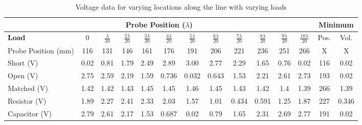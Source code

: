 \documentclass{article}
\begin{document}
\begin{table}[h]
	\begin{tabular}{|l|c|c|c|c|c|c|c|c|c|c|c|c|c|}
	\hline
	\multicolumn{12}{|c|}{\textbf{Probe Position ($\lambda$)}}                                                               	& \multicolumn{2}{c|}{\textbf{Minimum}} \\ \hline
	\textbf{Load}       & 0    & $\frac{\lambda}{20}$    & $\frac{2\lambda}{20}$    & $\frac{3\lambda}{20}$    & $\frac{4\lambda}{20}$     & $\frac{5\lambda}{20}$     & $\frac{6\lambda}{20}$     & $\frac{7\lambda}{20}$    & $\frac{8\lambda}{20}$    & $\frac{9\lambda}{20}$    & $\frac{10\lambda}{20}$   & Pos.         & Vol.          \\ \hline
	Probe Position (mm) & 116  & 131  & 146  & 161  & 176   & 191   & 206   & 221  & 236  & 251  & 266  & X            & X             \\ \hline
	Short (V)           & 0.02 & 0.81 & 1.79 & 2.49 & 2.89  & 3.00  & 2.77  & 2.29 & 1.65 & 0.76 & 0.02 & 116          & 0.02          \\ \hline
	Open (V)            & 2.75 & 2.59 & 2.19 & 1.59 & 0.736 & 0.032 & 0.643 & 1.53 & 2.21 & 2.61 & 2.73 & 193          & 0.02          \\ \hline
	Matched (V)         & 1.42 & 1.42 & 1.43 & 1.45 & 1.45  & 1.46  & 1.45  & 1.43 & 1.42 & 1.4  & 1.39 & 266          & 1.39          \\ \hline
	Resistor (V)        & 1.89 & 2.27 & 2.41 & 2.33 & 2.03  & 1.57  & 1.01  & 0.434& 0.591& 1.25 & 1.87 & 227          & 0.346         \\ \hline
	Capacitor (V)       & 2.79 & 2.61 & 2.17 & 1.53 & 0.687 & 0.02  & 0.79  & 1.65 & 2.31 & 2.69 & 2.77 & 191          & 0.02          \\ \hline
	\end{tabular}
	\caption{Voltage data for varying locations along the line with varying loads}
	\label{}
\end{table}
\end{document}
